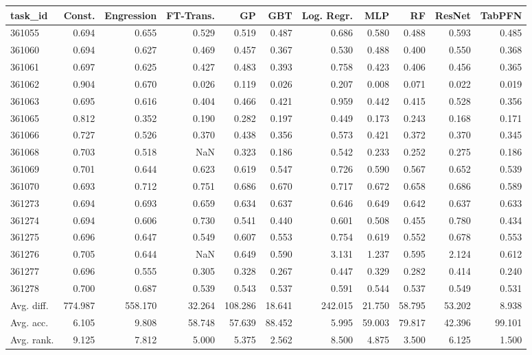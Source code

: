 \begin{tabular}{lrrrrrrrrrr}
\toprule
task\_id & Const. & Engression & FT-Trans. & GP & GBT & Log. Regr. & MLP & RF & ResNet & TabPFN \\
\midrule
361055 & 0.694 & 0.655 & 0.529 & 0.519 & 0.487 & 0.686 & 0.580 & 0.488 & 0.593 & 0.485 \\
361060 & 0.694 & 0.627 & 0.469 & 0.457 & 0.367 & 0.530 & 0.488 & 0.400 & 0.550 & 0.368 \\
361061 & 0.697 & 0.625 & 0.427 & 0.483 & 0.393 & 0.758 & 0.423 & 0.406 & 0.456 & 0.365 \\
361062 & 0.904 & 0.670 & 0.026 & 0.119 & 0.026 & 0.207 & 0.008 & 0.071 & 0.022 & 0.019 \\
361063 & 0.695 & 0.616 & 0.404 & 0.466 & 0.421 & 0.959 & 0.442 & 0.415 & 0.528 & 0.356 \\
361065 & 0.812 & 0.352 & 0.190 & 0.282 & 0.197 & 0.449 & 0.173 & 0.243 & 0.168 & 0.171 \\
361066 & 0.727 & 0.526 & 0.370 & 0.438 & 0.356 & 0.573 & 0.421 & 0.372 & 0.370 & 0.345 \\
361068 & 0.703 & 0.518 & NaN & 0.323 & 0.186 & 0.542 & 0.233 & 0.252 & 0.275 & 0.186 \\
361069 & 0.701 & 0.644 & 0.623 & 0.619 & 0.547 & 0.726 & 0.590 & 0.567 & 0.652 & 0.539 \\
361070 & 0.693 & 0.712 & 0.751 & 0.686 & 0.670 & 0.717 & 0.672 & 0.658 & 0.686 & 0.589 \\
361273 & 0.694 & 0.693 & 0.659 & 0.634 & 0.637 & 0.646 & 0.649 & 0.642 & 0.637 & 0.633 \\
361274 & 0.694 & 0.606 & 0.730 & 0.541 & 0.440 & 0.601 & 0.508 & 0.455 & 0.780 & 0.434 \\
361275 & 0.696 & 0.647 & 0.549 & 0.607 & 0.553 & 0.754 & 0.619 & 0.552 & 0.678 & 0.553 \\
361276 & 0.705 & 0.644 & NaN & 0.649 & 0.590 & 3.131 & 1.237 & 0.595 & 2.124 & 0.612 \\
361277 & 0.696 & 0.555 & 0.305 & 0.328 & 0.267 & 0.447 & 0.329 & 0.282 & 0.414 & 0.240 \\
361278 & 0.700 & 0.687 & 0.539 & 0.543 & 0.537 & 0.591 & 0.544 & 0.537 & 0.549 & 0.531 \\
Avg. diff. & 774.987 & 558.170 & 32.264 & 108.286 & 18.641 & 242.015 & 21.750 & 58.795 & 53.202 & 8.938 \\
Avg. acc. & 6.105 & 9.808 & 58.748 & 57.639 & 88.452 & 5.995 & 59.003 & 79.817 & 42.396 & 99.101 \\
Avg. rank. & 9.125 & 7.812 & 5.000 & 5.375 & 2.562 & 8.500 & 4.875 & 3.500 & 6.125 & 1.500 \\
\bottomrule
\end{tabular}
